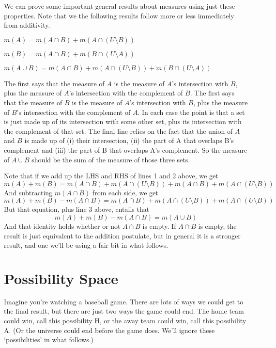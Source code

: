 We can prove some important general results about measures using just these properties. Note that we the following results follow more or less immediately from additivity.

\begin{enumerate*}
\item $m(A) = m(A \cap B) + m(A \cap (U \setminus B))$
\item $m(B) = m(A \cap B) + m(B \cap (U \setminus A))$
\item $m(A \cup B) = m(A \cap B) + m(A \cap (U \setminus B)) + m(B \cap (U \setminus A))$
\end{enumerate*}

The first says that the measure of $A$ is the measure of $A$'s intersection with $B$, plus the measure of $A$'s intersection with the complement of $B$. The first says that the measure of $B$ is the measure of $A$'s intersection with $B$, plus the measure of $B$'s intersection with the complement of $A$. In each case the point is that a set is just made up of its intersection with some other set, plus its intersection with the complement of that set. The final line relies on the fact that the union of $A$ and $B$ is made up of (i) their intersection, (ii) the part of A that overlaps B's complement and (iii) the part of B that overlaps A's complement. So the measure of $A \cup B$ should be the sum of the measure of those three sets.

Note that if we add up the LHS and RHS of lines 1 and 2 above, we get
\begin{equation*}
m(A) + m(B) = m(A \cap B) + m(A \cap (U \setminus B)) + m(A \cap B) + m(A \cap (U \setminus B))
\end{equation*}
And subtracting $m(A \cap B)$ from each side, we get
\begin{equation*}
m(A) + m(B) - m(A \cap B) = m(A \cap B) + m(A \cap (U \setminus B)) + m(A \cap (U \setminus B))
\end{equation*}
But that equation, plus line 3 above, entails that
\begin{equation*}
m(A) + m(B) - m(A \cap B) = m(A \cup B)
\end{equation*}
And that identity holds whether or not $A \cap B$ is empty. If $A \cap B$ is empty, the result is just equivalent to the addition postulate, but in general it is a stronger result, and one we'll be using a fair bit in what follows.

\section{Possibility Space}
Imagine you're watching a baseball game. There are lots of ways we could get to the final result, but there are just two ways the game could end. The home team could win, call this possibility H, or the away team could win, call this possibility A. (Or the universe could end before the game does. We'll ignore these `possibilities' in what follows.)

